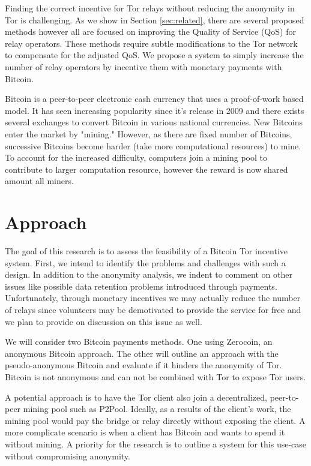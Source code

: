 \documentclass[letterpaper]{article}
\begin{document}
Finding the correct incentive for Tor relays without reducing the
anonymity in Tor is challenging.  As we show in Section
\ref{sec:related}, there are several proposed methods however all are
focused on improving the Quality of Service (QoS) for relay
operators.  These methods require subtle modifications to the Tor
network to compensate for the adjusted QoS.  We propose a system to
simply increase the number of relay operators by incentive them
with monetary payments with Bitcoin.

Bitcoin is a peer-to-peer electronic cash currency that uses a
proof-of-work based model\cite{nakamoto2009bitcoin}.  It has seen
increasing popularity since it's release in 2009 and there exists
several exchanges to convert Bitcoin in various national currencies.
New Bitcoins enter the market by "mining."  However, as there are
fixed number of Bitcoins, successive Bitcoins become harder (take more
computational resources) to mine.  To account for the increased
difficulty, computers join a mining
pool\cite{DBLP:journals/corr/abs-1112-4980} to contribute to larger
computation resource, however the reward is now shared amount all miners.


\section{Approach}\label{sec:approach}

The goal of this research is to assess the feasibility of a Bitcoin
Tor incentive system.  First, we intend to identify the problems and
challenges with such a design.  In addition to the anonymity analysis,
we indent to comment on other issues like possible data retention
problems introduced through payments\cite{data-retention}.
Unfortunately, through monetary incentives we may actually reduce the
number of relays since volunteers may be demotivated to provide the
service for free\cite{RePEc:eee:joepsy:v:30:y:2009:i:3:p:500-508} and
we plan to provide on discussion on this issue as well.


We will consider two Bitcoin payments
methods.  One using Zerocoin\cite{Miers:2013:ZAD:2497621.2498124}, an
anonymous Bitcoin approach.  The other will outline an approach with
the pseudo-anonymous Bitcoin and evaluate if it hinders the anonymity
of Tor.  Bitcoin is not anonymous\cite{journals/iacr/AndroulakiKRSC12}
and can not be combined with Tor to expose Tor users.

A potential approach is to have the Tor client also join a
decentralized, peer-to-peer mining pool such as P2Pool.  Ideally, as a
results of the client's work, the mining pool would pay the bridge or
relay directly without exposing the client.  A more complicate
scenario is when a client has Bitcoin and wants to spend it without
mining.  A priority for the research is to outline a system for this
use-case without compromising anonymity.
\end{document}
